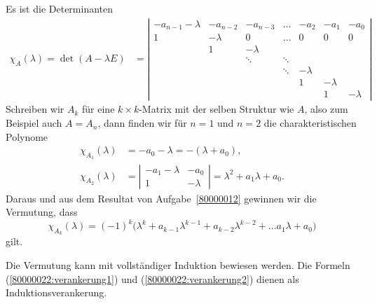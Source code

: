\begin{loesung}
Es ist die Determinanten
\begin{align*}
\chi_A(\lambda)
=
\det(A-\lambda E)
&=
\left|\begin{matrix}
-a_{n-1}-\lambda&-a_{n-2}&-a_{n-3}&\dots & -a_2   & -a_1   & -a_0  \\
   1            &-\lambda&   0    &\dots &   0    &   0    &   0   \\
                &   1    &-\lambda&      &        &        &       \\
                &        &\ddots  &\ddots&        &        &       \\
                &        &        &\ddots&-\lambda&        &       \\
                &        &        &      &   1    &-\lambda&       \\
                &        &        &      &        &   1    &-\lambda
\end{matrix}\right|
\end{align*}
Schreiben wir $A_k$ für eine $k\times k$-Matrix mit der selben
Struktur wie $A$, also zum Beispiel auch $A=A_n$, dann finden wir
für $n=1$ und $n=2$ die charakteristischen Polynome
\begin{align}
\chi_{A_1}(\lambda)
&=
-a_0-\lambda = -(\lambda+a_0),
\label{80000022:verankerung1}
\\
\chi_{A_2}(\lambda)
&=
\left|\begin{matrix}
-a_1-\lambda&  -a_0  \\
1           &-\lambda
\end{matrix}\right|
=\lambda^2+a_1\lambda+a_0.
\label{80000022:verankerung2}
\end{align}
Daraus und aus dem Resultat von Aufgabe~\ref{80000012} gewinnen wir
die Vermutung, dass 
\[
\chi_{A_k}(\lambda)
=
(-1)^k\bigl(
\lambda^k+a_{k-1}\lambda^{k-1}+a_{k-2}\lambda^{k-2}+\dots a_1\lambda+a_0
\bigr)
\]
gilt.

Die Vermutung kann mit vollständiger Induktion bewiesen werden.
Die Formeln (\ref{80000022:verankerung1}) und (\ref{80000022:verankerung2})
dienen als Induktionsverankerung.


\end{loesung}
